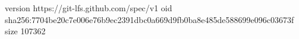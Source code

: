 version https://git-lfs.github.com/spec/v1
oid sha256:7704be20c7e006e76b9ec2391dbc0a669d9fb0ba8e485de588699e096c03673f
size 107362
